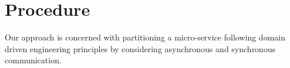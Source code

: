 \section{Procedure} \label{Procedure}
Our approach is concerned with partitioning a micro-service following domain driven 
engineering principles by considering asynchronous and synchronous communication.

